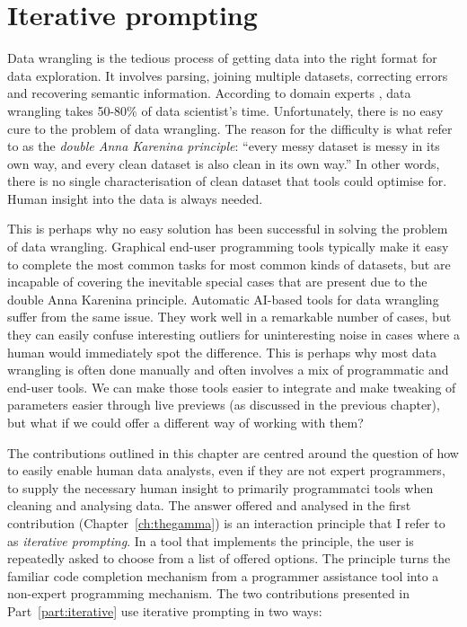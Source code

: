 \documentclass[fleqn,11pt]{report}
\theoremstyle{definition}
\begin{document}

\chapter{Iterative prompting}
\label{ch:iterative}

Data wrangling is the tedious process of getting data into the right format for data exploration.
It involves parsing, joining multiple datasets, correcting errors and recovering semantic
information. According to domain experts \citep{rattenbury-2017-wrangling}, data wrangling
takes 50-80\% of data scientist's time. Unfortunately, there is no easy cure to the problem
of data wrangling. The reason for the difficulty is what \cite{gerrit-2019-csv} refer to
as the \emph{double Anna Karenina principle}: ``every messy dataset is messy in its own way, and
every clean dataset is also clean in its own way.'' In other words, there is no single
characterisation of clean dataset that tools could optimise for. Human insight into the data
is always needed.

This is perhaps why no easy solution has been successful in solving the problem of data wrangling.
Graphical end-user programming tools typically make it easy to complete the
most common tasks for most common kinds of datasets, but are incapable of covering the
inevitable special cases that are present due to the double Anna Karenina principle.
Automatic AI-based tools for data wrangling suffer from the same issue. They work well in a
remarkable number of cases, but they can easily confuse interesting outliers for uninteresting
noise in cases where a human would immediately spot the difference. This is perhaps why most
data wrangling is often done manually and often involves a mix of programmatic and end-user
tools. We can make those tools easier to integrate and make tweaking of parameters easier through
live previews (as discussed in the previous chapter), but what if we could offer a different way
of working with them?

The contributions outlined in this chapter are centred around the question of how to
easily enable human data analysts, even if they are not expert programmers, to supply the
necessary human insight to primarily programmatci tools when cleaning and analysing data.
The answer offered and analysed in the first contribution (Chapter~\ref{ch:thegamma}) is
an interaction principle that I refer to as \emph{iterative prompting}. In a tool that
implements the principle, the user is repeatedly asked to choose from a list of offered options.
The principle turns the familiar code completion mechanism from a programmer assistance tool
into a non-expert programming mechanism. The two contributions presented in Part~\ref{part:iterative}
use iterative prompting in two ways:
\end{document}
